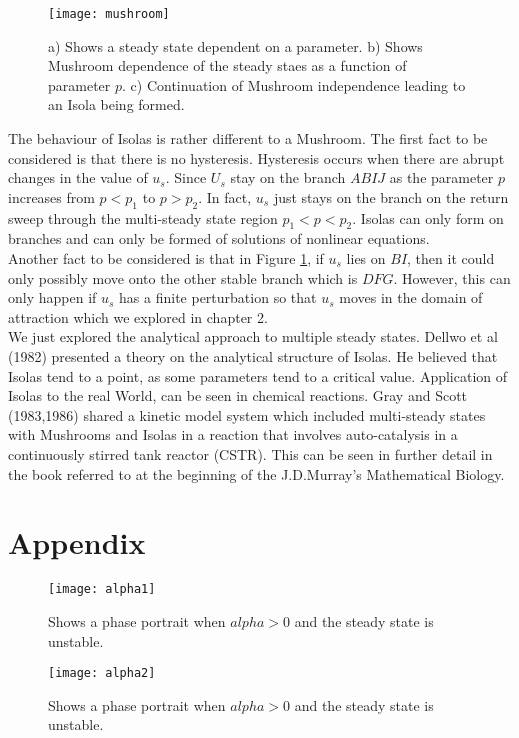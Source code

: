 \documentclass[a4paper]{report}
\theoremstyle{definition}
\begin{document}
\begin{figure}
 \texttt{[image: mushroom]}
  \caption{a) Shows a steady state dependent on a parameter. b) Shows Mushroom dependence of the steady staes as a function of parameter $p$. c) Continuation of Mushroom independence leading to an Isola being formed.}
  \label{figure1c}
\end{figure}
The behaviour of Isolas is rather different to a Mushroom. The first fact to be considered is that there is no hysteresis. Hysteresis occurs when there are abrupt changes in the value of $u_s$. Since $U_s$ stay on the branch $ABIJ$ as the parameter $p$ increases from $p<p_1$ to $p>p_2$. In fact, $u_s$ just stays on the branch on the return sweep through the multi-steady state region $p_1<p<p_2$. Isolas can only form on branches and can only be formed of solutions of nonlinear equations.\\
Another fact to be considered is that in Figure \ref{figure1c}, if $u_s$ lies on $BI$, then it could only  possibly move onto the other stable branch which is $DFG$. However, this can only happen if $u_s$ has a finite perturbation so that $u_s$ moves in the domain of attraction which we explored in chapter 2. \\
We just explored the analytical approach to multiple steady states. Dellwo et al (1982) presented a theory on the analytical structure of Isolas. He believed that Isolas tend to a point, as some parameters tend to a critical value. Application of Isolas to the real World, can be seen in chemical reactions. Gray and Scott (1983,1986) shared a kinetic model system which included multi-steady states with Mushrooms and Isolas in a reaction that involves auto-catalysis in a continuously stirred tank reactor (CSTR). This can be seen in further detail in the book referred to at the beginning of the J.D.Murray's Mathematical Biology. 
\chapter{Appendix}
\begin{figure}[H]
 \texttt{[image: alpha1]}
  \caption{Shows a phase portrait when $alpha>0$ and the steady state is unstable.}
  \label{figure3}
\end{figure}
\begin{figure}[H]
 \texttt{[image: alpha2]}
  \caption{Shows a phase portrait when $alpha>0$ and the steady state is unstable.}
  \label{figure3}
\end{figure}
\end{document}
